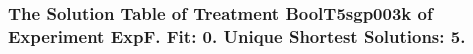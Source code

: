  \begin{frame}
 \fontsize{8pt}{9pt}\selectfont
 \frametitle{ The Solution Table of Treatment BoolT5sgp003k of Experiment ExpF. Fit: 0. Unique Shortest Solutions: 5. }

 \label{ExpFSolutionTable001.tex}  
 \end{frame}

